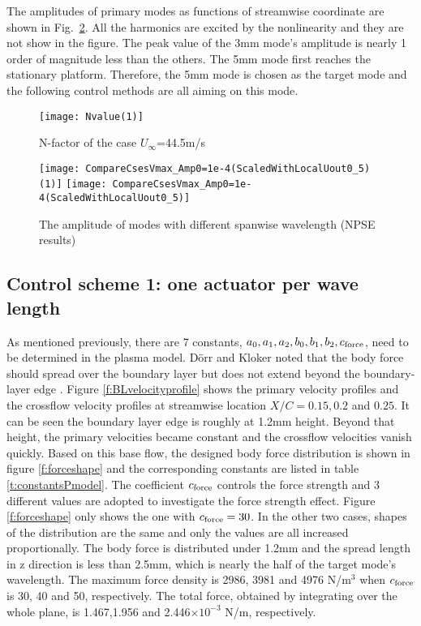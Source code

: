 \documentclass{AIAA}
\begin{document}
The amplitudes of primary modes as functions of streamwise coordinate are shown in Fig.~\ref{f:NPSE}. All the harmonics are excited by the nonlinearity and they are not show in the figure. The peak value of the 3mm mode's amplitude is nearly 1 order of magnitude less than the others. The 5mm mode first reaches the stationary platform. Therefore, the 5mm mode is chosen as the target mode and the following control methods are all aiming on this mode.
\begin{figure}
\centering
  \texttt{[image: Nvalue(1)]}
  \caption{N-factor of the case $U_\infty$=44.5m/s}%
  \label{fig:Nfactor445}
\end{figure}
\begin{figure}
\centering
  \texttt{[image: CompareCsesVmax\_Amp0=1e-4(ScaledWithLocalUout0\_5)(1)]} \texttt{[image: CompareCsesVmax\_Amp0=1e-4(ScaledWithLocalUout0\_5)]}
  \caption{The amplitude of modes with different spanwise wavelength (NPSE results)}\label{f:NPSE}%
\end{figure}

\subsection{Control scheme 1: one actuator per wave length}\label{subs:control1}
As mentioned previously, there are 7 constants, $a_0,a_1,a_2,b_0,b_1,b_2,c_{\rm force}$, need to be determined in the plasma model. D\"orr and Kloker noted that the body force should spread over the boundary layer but does not extend beyond the boundary-layer edge \cite{dorr2015stabilisation}. Figure \ref{f:BLvelocityprofile} shows the primary velocity profiles and the crossflow velocity profiles at streamwise location $X/C=0.15,0.2$ and $0.25$. It can be seen the boundary layer edge is roughly at 1.2mm height. Beyond that height, the primary velocities became constant and the crossflow velocities vanish quickly. Based on this base flow, the designed body force distribution is shown in figure \ref{f:forceshape} and the corresponding constants are listed in table \ref{t:constantsPmodel}. The coefficient $c_{\rm force}$ controls the force strength and 3 different values are adopted to investigate the force strength effect. Figure \ref{f:forceshape} only shows the one with $c_{\rm force}=30$. In the other two cases, shapes of the distribution are the same and only the values are all increased proportionally. The body force is distributed under 1.2mm and the spread length in z direction is less than 2.5mm, which is nearly the half of the target mode's wavelength. The maximum force density is 2986, 3981 and 4976 N/m$^3$ when $c_{\rm force}$ is 30, 40 and 50, respectively. The total force, obtained by integrating over the whole plane, is 1.467,1.956 and 2.446$\times 10^{-3}$ N/m, respectively.
\end{document}
